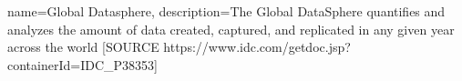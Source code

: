  {
   name=Global Datasphere,
   description={The Global DataSphere quantifies and analyzes the amount of data created, captured, and replicated in any given year across the world [SOURCE https://www.idc.com/getdoc.jsp?containerId=IDC_P38353]}
}